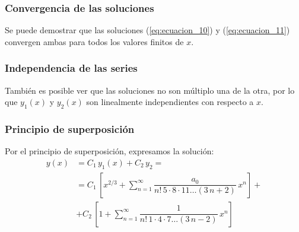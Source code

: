 \documentclass[12pt]{beamer}
\begin{document}
\begin{frame}
\frametitle{Convergencia de las soluciones}
Se puede demostrar que las soluciones (\ref{eq:ecuacion_10}) y (\ref{eq:ecuacion_11}) convergen ambas para todos los valores finitos de $x$.
\end{frame}
\begin{frame}
\frametitle{Independencia de las series}
También es posible ver que las soluciones no son múltiplo una  de la otra, por lo que $y_{1}(x)$ y $y_{2}(x)$ son linealmente independientes con respecto a $x$.
\end{frame}
\begin{frame}
\frametitle{Principio de superposición}
Por el principio de superposición, expresamos la solución:
\begin{align*}
y(x) &= C_{1} \, y_{1} (x) + C_{2} \, y_{2} = \\[0.5em]
&= C_{1} \, \left[ x^{2/3} + \sum_{n=1}^{\infty} \dfrac{a_{0}}{n! \, 5 \cdot 8 \cdot 11 \ldots (3\, n + 2)} \, x^{n} \right] + \\[0.5em]
&+ C_{2} \, \left[ 1 + \sum_{n=1}^{\infty} \dfrac{1}{n! \, 1 \cdot 4 \cdot 7 \ldots (3\, n - 2)} \, x^{n} \right]
\end{align*}
\end{frame}

\end{document}
